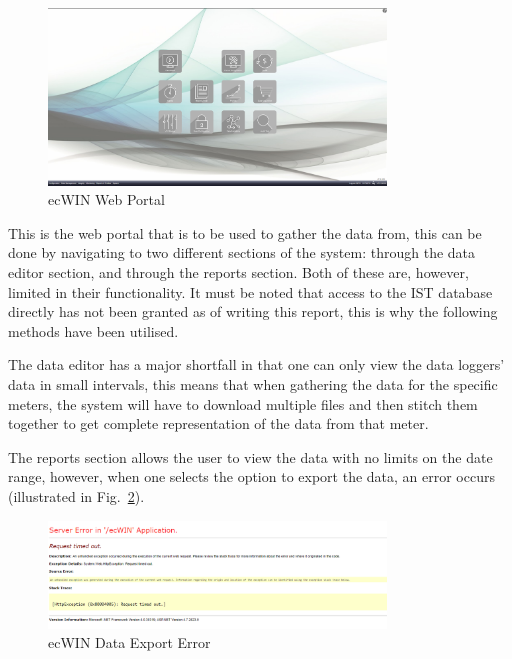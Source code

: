 \documentclass[12pt,onecolumn]{IEEEtran}
\begin{document}
\begin{center}
    \begin{figure}[htb]
        \centering
        \includegraphics[width=0.8\textwidth]{ecwin.png}
        \caption{ecWIN Web Portal}
        \label{fig:ecwin}
    \end{figure}
\end{center}

This is the web portal that is to be used to gather the data from, this can be done by navigating to two different sections of the system: through the data editor section, and through the reports section. Both of these are, however, limited in their functionality. It must be noted that access to the IST database directly has not been granted as of writing this report, this is why the following methods have been utilised.

The data editor has a major shortfall in that one can only view the data loggers' data in small intervals, this means that when gathering the data for the specific meters, the system will have to download multiple files and then stitch them together to get complete representation of the data from that meter.

The reports section allows the user to view the data with no limits on the date range, however, when one selects the option to export the data, an error occurs (illustrated in Fig.~\ref{fig:ecwinerror}). 

\begin{center}
    \begin{figure}[htb]
        \centering
        \includegraphics[width=0.8\textwidth]{ecwinerror.png}
        \caption{ecWIN Data Export Error}
        \label{fig:ecwinerror}
    \end{figure}
\end{center}
\end{document}
